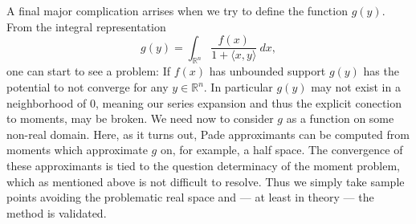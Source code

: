 \documentclass{amsart}
\theoremstyle{remark}
\numberwithin{equation}{section}
\newcommand{\RR}{\mathbb{R}}
\begin{document}
A final major complication arrises when we try to define the function $g(y)$. From the integral representation
\[
    g(y) = \int_{\RR^n} \frac{f(x)}{1 + \langle x, y\rangle} ~dx,
\]
one can start to see a problem: If $f(x)$ has unbounded support $g(y)$ has the potential to not converge for any $y \in \RR^n$. In particular $g(y)$ may not exist in a neighborhood of $0$, meaning our series expansion and thus the explicit conection to moments, may be broken. We need now to consider $g$ as a function on some non-real domain. Here, as it turns out, Pade approximants can be computed from moments which approximate $g$ on, for example, a half space. The convergence of these approximants is tied to the question determinacy of the moment problem, which as mentioned above is not difficult to resolve. Thus we simply take sample points avoiding the problematic real space and — at least in theory — the method is validated.




\end{document}
